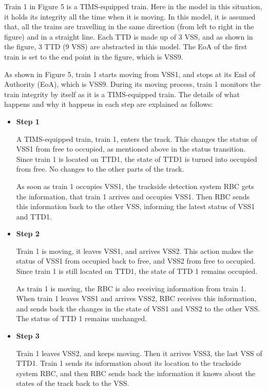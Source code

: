 \documentclass[article,dr=phil,type=drfinal,colorback,accentcolor=tud9c]{tudthesis}
\begin{document}
  Train 1 in Figure 5 is a TIMS-equipped train. Here in the model in this situation, it holds its integrity all the time when it is moving. In this model, it is assumed that, all the trains are travelling in the same direction (from left to right in the figure) and in a straight line. Each TTD is made up of 3 VSS, and as shown in the figure, 3 TTD (9 VSS) are abstracted in this model. The EoA of the first train is set to the end point in the figure, which is VSS9.

  As shown in Figure 5, train 1 starts moving from VSS1, and stops at its End of Authority (EoA), which is VSS9. During its moving process, train 1 monitors the train integrity by itself as it is a TIMS-equipped train. The details of what happens and why it happens in each step are explained as follows:
  
  \begin{itemize}
  	
  	\item \textbf{Step 1}
  	
  	A TIMS-equipped train, train 1, enters the track. This changes the status of VSS1 from free to occupied, as mentioned above in the status transition. Since train 1 is located on TTD1, the state of TTD1 is turned into occupied from free. No changes to the other parts of the track.
  	
  	As soon as train 1 occupies VSS1, the trackside detection system RBC gets the information, that train 1 arrives and occupies VSS1. Then RBC sends this information back to the other VSS, informing the latest status of VSS1 and TTD1.
  	
  	\item \textbf{Step 2}
  	
  	Train 1 is moving, it leaves VSS1, and arrives VSS2. This action makes the status of VSS1 from occupied back to free, and VSS2 from free to occupied. Since train 1 is still located on TTD1, the state of TTD 1 remains occupied.
  	
  	As train 1 is moving, the RBC is also receiving information from train 1. When train 1 leaves VSS1 and arrives VSS2, RBC receives this information, and sends back the changes in the state of VSS1 and VSS2 to the other VSS. The status of TTD 1 remains unchanged. 	
  	
  	\item \textbf{Step 3}
  	
  	Train 1 leaves VSS2, and keeps moving. Then it arrives VSS3, the last VSS of TTD1. Train 1 sends its information about its location to the trackside system RBC, and then RBC sends back the information it knows about the states of the track back to the VSS.
  	

\end{itemize}
\end{document}
